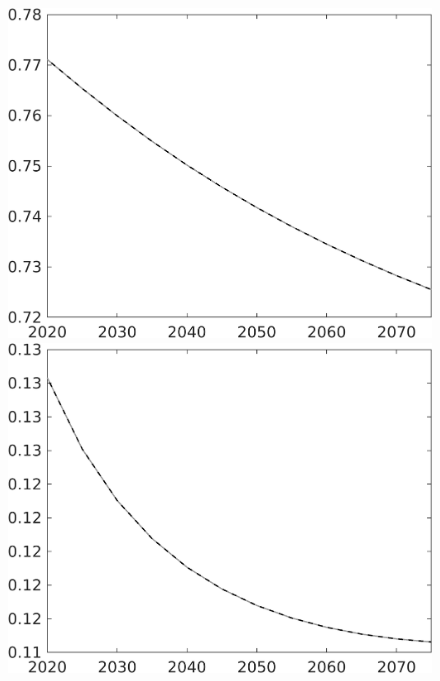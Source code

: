 \documentclass[12pt]{article}
\begin{document}
\begin{figure}
\begin{minipage}[]{0.32\textwidth}
	\end{minipage}	
	\begin{minipage}[]{0.32\textwidth}
		\includegraphics[width=1\textwidth]{../../codding_model/own_basedOnFried/optimalPol_010922_revision/figures/all_13Sept22/CompTaul_Equlab_LFBAU_Reg0_sn_spillover0_nsk1_xgr0_knspil0_sep1_countec0_GovRev0_etaa0.79_lgd0.png}
	\end{minipage}	
	\begin{minipage}[]{0.32\textwidth}
		\includegraphics[width=1\textwidth]{../../codding_model/own_basedOnFried/optimalPol_010922_revision/figures/all_13Sept22/CompTaul_Equlab_LFBAU_Reg0_sff_spillover0_nsk1_xgr0_knspil0_sep1_countec0_GovRev0_etaa0.79_lgd0.png}

\end{minipage}
\end{figure}
\end{document}
